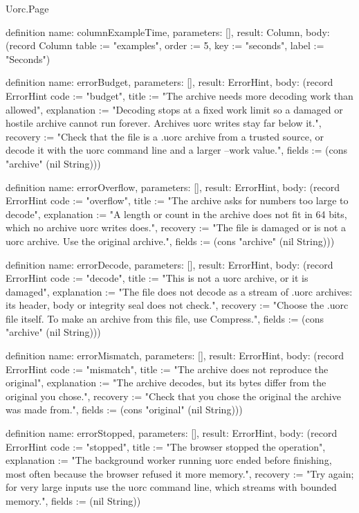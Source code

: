 \begin{lexlean}{Uorc.Page}
\begin{semanticmodule}
definition{
  name: columnExampleTime,
  parameters: [],
  result: Column,
  body: (record Column {table := "examples", order := 5, key := "seconds", label := "Seconds"})
}

definition{
  name: errorBudget,
  parameters: [],
  result: ErrorHint,
  body: (record ErrorHint {code := "budget", title := "The archive needs more decoding work than allowed", explanation := "Decoding stops at a fixed work limit so a damaged or hostile archive cannot run forever. Archives uorc writes stay far below it.", recovery := "Check that the file is a .uorc archive from a trusted source, or decode it with the uorc command line and a larger --work value.", fields := (cons "archive" (nil String))})
}

definition{
  name: errorOverflow,
  parameters: [],
  result: ErrorHint,
  body: (record ErrorHint {code := "overflow", title := "The archive asks for numbers too large to decode", explanation := "A length or count in the archive does not fit in 64 bits, which no archive uorc writes does.", recovery := "The file is damaged or is not a uorc archive. Use the original archive.", fields := (cons "archive" (nil String))})
}

definition{
  name: errorDecode,
  parameters: [],
  result: ErrorHint,
  body: (record ErrorHint {code := "decode", title := "This is not a uorc archive, or it is damaged", explanation := "The file does not decode as a stream of .uorc archives: its header, body or integrity seal does not check.", recovery := "Choose the .uorc file itself. To make an archive from this file, use Compress.", fields := (cons "archive" (nil String))})
}

definition{
  name: errorMismatch,
  parameters: [],
  result: ErrorHint,
  body: (record ErrorHint {code := "mismatch", title := "The archive does not reproduce the original", explanation := "The archive decodes, but its bytes differ from the original you chose.", recovery := "Check that you chose the original the archive was made from.", fields := (cons "original" (nil String))})
}

definition{
  name: errorStopped,
  parameters: [],
  result: ErrorHint,
  body: (record ErrorHint {code := "stopped", title := "The browser stopped the operation", explanation := "The background worker running uorc ended before finishing, most often because the browser refused it more memory.", recovery := "Try again; for very large inputs use the uorc command line, which streams with bounded memory.", fields := (nil String)})
}


\end{semanticmodule}
\end{lexlean}
